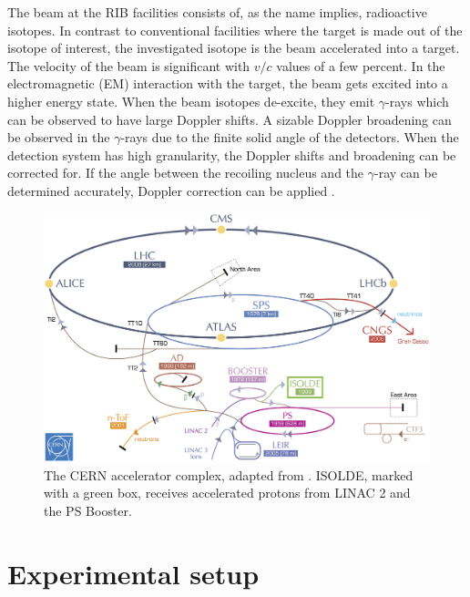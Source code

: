 \documentclass[twoside,english]{uiofysmaster/uiofysmaster}
\newcommand{\ga}{$\gamma$}
\begin{document}
The beam at the RIB facilities consists of, as the name implies, radioactive isotopes. 
In contrast to conventional facilities where the target is made out of the isotope of interest, the investigated isotope is the beam accelerated into a target.
The velocity of the beam is significant with $v/c$ values of a few percent. 
In the electromagnetic (EM) interaction with the target, the beam gets excited into a higher energy state.
When the beam isotopes de-excite, they emit \ga-rays which can be observed to have large Doppler shifts.
A sizable Doppler broadening can be observed in the \ga-rays due to the finite solid angle of the detectors. 
When the detection system has high granularity, the Doppler shifts and broadening can be corrected for. 
If the angle between the recoiling nucleus and the \ga-ray can be determined accurately, Doppler correction can be applied \cite{MB-spect}.

\begin{figure}[ht]
	\centering
	\includegraphics[width=\textwidth]{Images/CERN-accelerators.png}
	\caption{The CERN accelerator complex, adapted from \cite{CERN-AC}. ISOLDE, marked with a green box, receives accelerated protons from LINAC 2 and the PS Booster.}
	\label{fig:accelerators}
\end{figure}


\section{Experimental setup}
\end{document}
